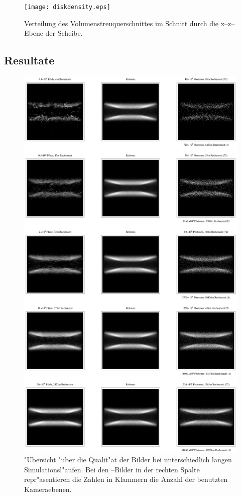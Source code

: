 		\begin{figure}
			\centering
			\texttt{[image: diskdensity.eps]}
			\caption{Verteilung des Volumenstreuquerschnittes im Schnitt durch die x--z--Ebene der Scheibe.}
			\label{fig:diskdensity}
		\end{figure}
	
	\subsection{Resultate}
	
		\begin{figure}
			\centering
			\includegraphics[height=1.0\textheight]{diskimageoverview.eps}
			\caption{"Ubersicht "uber die Qualit"at der Bilder bei unterschiedlich langen Simulationsl"aufen. Bei den \mctd--Bilder in der rechten Spalte repr"asentieren die Zahlen in Klammern die Anzahl der benutzten Kameraebenen.}
			\label{fig:pirate_sphere_imageoverview}
		\end{figure}
	
